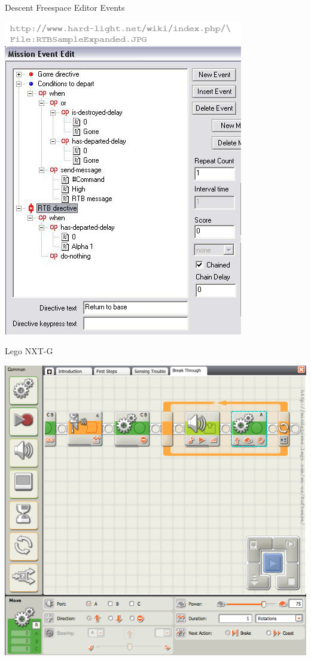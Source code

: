 \documentclass[handout]{beamer}
\begin{document}

\begin{frame}{Descent Freespace Editor Events}

\includegraphics[height=.8\textheight]{freespace}

\end{frame}


\begin{frame}{Lego NXT-G}

\includegraphics[height=.8\textheight]{lego}

\end{frame}
\end{document}
